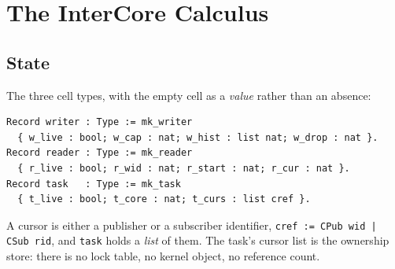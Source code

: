 \documentclass[10pt,journal,compsoc,twocolumn]{article}
\theoremstyle{definition}
\theoremstyle{remark}
\theoremstyle{plain}
\newcommand{\ctr}[1]{\texttt{#1}}
\begin{document}
\section{The InterCore Calculus}
\label{sec:intercore}

\subsection{State}
The three cell types, with the empty cell as a \emph{value} rather than an absence:
\begin{lstlisting}[language=Coq]
Record writer : Type := mk_writer
  { w_live : bool; w_cap : nat; w_hist : list nat; w_drop : nat }.
Record reader : Type := mk_reader
  { r_live : bool; r_wid : nat; r_start : nat; r_cur : nat }.
Record task   : Type := mk_task
  { t_live : bool; t_core : nat; t_curs : list cref }.
\end{lstlisting}
A cursor is either a publisher or a subscriber identifier, \ctr{cref := CPub wid | CSub rid}, and \ctr{task} holds a \emph{list} of them. The task's cursor list is the ownership store: there is no lock table, no kernel object, no reference count.
\end{document}
